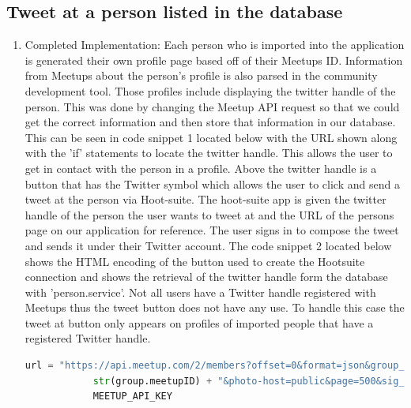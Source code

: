 \documentclass[draftclsnofoot,10pt,onecolumn]{IEEEtran} %
\begin{document}
\subsection{Tweet at a person listed in the database}
\begin{enumerate}[label*=\arabic*.]
  \item Completed Implementation: Each person who is imported into the application
    is generated their own profile page based off of their Meetups ID. Information from 
    Meetups about the person’s profile is also parsed in the community development tool. Those profiles
    include displaying the twitter handle of the person. This was done by changing
    the Meetup API request so that we could get the correct information and
    then store that information in our database. This can be seen in code snippet 1 located below 
    with the URL shown along with the 'if' statements to locate the twitter handle. This allows the user to get 
    in contact with the person in a profile. Above the
    twitter handle is a button that has the Twitter symbol which allows the user
    to click and send a tweet at the person via Hoot-suite. The hoot-suite app is
    given the twitter handle of the person the user wants to tweet at and the URL
    of the persons page on our application for reference. The user signs in to
    compose the tweet and sends it under their Twitter account. The code snippet 2 located below 
    shows the HTML encoding of the button used to create the Hootsuite connection and shows the 
    retrieval of the twitter handle form the database with 'person.service'. Not all users have a
    Twitter handle registered with Meetups thus the tweet button does not have any use. To handle this case
    the tweet at button only appears on profiles of imported people that have a registered Twitter handle.
    
    \newpage
      

\begin{center}
  \captionsetup{width=.5\linewidth}
  \begin{lstlisting}[caption=Views.py file where twitter handle is identified and stored, language=Python]
            url = "https://api.meetup.com/2/members?offset=0&format=json&group_id=" + 
            str(group.meetupID) + "&photo-host=public&page=500&sig_id=148657742&key=" + 
            MEETUP_API_KEY
           

\end{lstlisting}
\end{center}
\end{enumerate}
\end{document}
